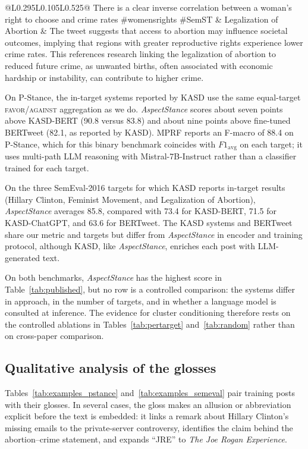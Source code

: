 \documentclass[pdflatex,sn-mathphys-num,iicol]{sn-jnl}%
\begin{document}
\begin{table}[p]
\begin{tabular}{@{}L{0.295\textwidth}L{0.105\textwidth}L{0.525\textwidth}@{}}
		\addlinespace[3pt]
		There is a clear inverse correlation between a woman's right to choose and crime rates \#womensrights \#SemST & Legalization of Abortion & The tweet suggests that access to abortion may influence societal outcomes, implying that regions with greater reproductive rights experience lower crime rates. This references research linking the legalization of abortion to reduced future crime, as unwanted births, often associated with economic hardship or instability, can contribute to higher crime. \\
		\bottomrule
	\end{tabular}
\end{table}

On P-Stance, the in-target systems reported by KASD use the same equal-target \textsc{favor}/\textsc{against} aggregation as we do. \textit{AspectStance} scores about seven points above KASD-BERT (90.8 versus 83.8) and about nine points above fine-tuned BERTweet \cite{nguyen2020bertweet} (82.1, as reported by KASD). MPRF reports an F-macro of 88.4 on P-Stance, which for this binary benchmark coincides with \(F1_{\mathrm{avg}}\) on each target; it uses multi-path LLM reasoning with Mistral-7B-Instruct rather than a classifier trained for each target.

On the three SemEval-2016 targets for which KASD reports in-target results (Hillary Clinton, Feminist Movement, and Legalization of Abortion), \textit{AspectStance} averages 85.8, compared with 73.4 for KASD-BERT, 71.5 for KASD-ChatGPT, and 63.6 for BERTweet. The KASD systems and BERTweet share our metric and targets but differ from \textit{AspectStance} in encoder and training protocol, although KASD, like \textit{AspectStance}, enriches each post with LLM-generated text.

On both benchmarks, \textit{AspectStance} has the highest score in Table~\ref{tab:published}, but no row is a controlled comparison: the systems differ in approach, in the number of targets, and in whether a language model is consulted at inference. The evidence for cluster conditioning therefore rests on the controlled ablations in Tables~\ref{tab:pertarget} and~\ref{tab:random} rather than on cross-paper comparison.

\subsection{Qualitative analysis of the glosses}\label{sec:qualitative}

Tables~\ref{tab:examples_pstance} and~\ref{tab:examples_semeval} pair training posts with their glosses. In several cases, the gloss makes an allusion or abbreviation explicit before the text is embedded: it links a remark about Hillary Clinton's missing emails to the private-server controversy, identifies the claim behind the abortion--crime statement, and expands ``JRE'' to \textit{The Joe Rogan Experience}.
\end{document}
